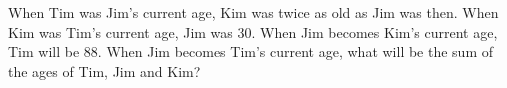 When Tim was Jim's current age, Kim was twice as old as Jim was then. When Kim was Tim's current age, Jim was $30$. When Jim becomes Kim's current age, Tim will be $88$. When Jim becomes Tim's current age, what will be the sum of the ages of Tim, Jim and Kim?

